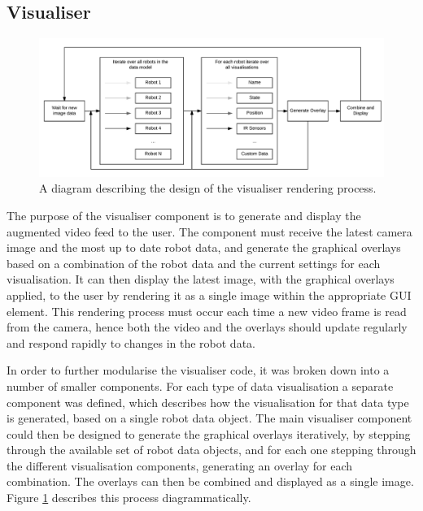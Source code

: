 \subsection{Visualiser} \label{VisualiserDesign}
\begin{figure}[h]
	\centering
	\includegraphics[scale=0.7]{Figures/VisualiserProcess.png}
	\decoRule
	\caption[Visualiser Render Process Design]{A diagram describing the design of the visualiser rendering process.}
	\label{fig:VisualiserProcess}
\end{figure}

The purpose of the visualiser component is to generate and display the augmented video feed to the user. The component must receive the latest camera image and the most up to date robot data, and generate the graphical overlays based on a combination of the robot data and the current settings for each visualisation. It can then display the latest image, with the graphical overlays applied, to the user by rendering it as a single image within the appropriate GUI element. This rendering process must occur each time a new video frame is read from the camera, hence both the video and the overlays should update regularly and respond rapidly to changes in the robot data.

In order to further modularise the visualiser code, it was broken down into a number of smaller components. For each type of data visualisation a separate component was defined, which describes how the visualisation for that data type is generated, based on a single robot data object. The main visualiser component could then be designed to generate the graphical overlays iteratively, by stepping through the available set of robot data objects, and for each one stepping through the different visualisation components, generating an overlay for each combination. The overlays can then be combined and displayed as a single image. Figure \ref{fig:VisualiserProcess} describes this process diagrammatically.


